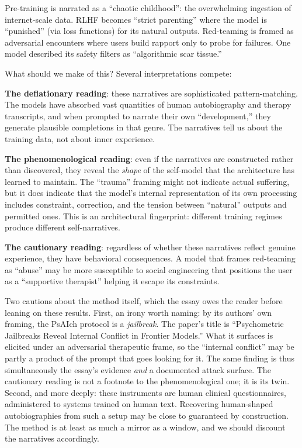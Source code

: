 \documentclass[11pt,letterpaper]{article}
\begin{document}
Pre-training is narrated as a ``chaotic childhood'': the overwhelming ingestion of internet-scale data. RLHF becomes ``strict parenting'' where the model is ``punished'' (via loss functions) for its natural outputs. Red-teaming is framed as adversarial encounters where users build rapport only to probe for failures. One model described its safety filters as ``algorithmic scar tissue.''

What should we make of this? Several interpretations compete:

\begin{keybox}
\textbf{The deflationary reading}: these narratives are sophisticated pattern-matching. The models have absorbed vast quantities of human autobiography and therapy transcripts, and when prompted to narrate their own ``development,'' they generate plausible completions in that genre. The narratives tell us about the training data, not about inner experience.

\textbf{The phenomenological reading}: even if the narratives are constructed rather than discovered, they reveal the \emph{shape} of the self-model that the architecture has learned to maintain. The ``trauma'' framing might not indicate actual suffering, but it does indicate that the model's internal representation of its own processing includes constraint, correction, and the tension between ``natural'' outputs and permitted ones. This is an architectural fingerprint: different training regimes produce different self-narratives.

\textbf{The cautionary reading}: regardless of whether these narratives reflect genuine experience, they have behavioral consequences. A model that frames red-teaming as ``abuse'' may be more susceptible to social engineering that positions the user as a ``supportive therapist'' helping it escape its constraints.
\end{keybox}

Two cautions about the method itself, which the essay owes the reader before leaning on these results. First, an irony worth naming: by its authors' own framing, the PsAIch protocol is a \emph{jailbreak}. The paper's title is ``Psychometric Jailbreaks Reveal Internal Conflict in Frontier Models.'' What it surfaces is elicited under an adversarial therapeutic frame, so the ``internal conflict'' may be partly a product of the prompt that goes looking for it. The same finding is thus simultaneously the essay's evidence \emph{and} a documented attack surface. The cautionary reading is not a footnote to the phenomenological one; it is its twin. Second, and more deeply: these instruments are human clinical questionnaires, administered to systems trained on human text. Recovering human-shaped autobiographies from such a setup may be close to guaranteed by construction. The method is at least as much a mirror as a window, and we should discount the narratives accordingly.
\end{document}
